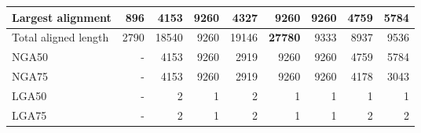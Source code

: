 \documentclass[12pt,a4paper]{article}
\begin{document}
\begin{table}[ht]
\begin{center}
\begin{tabular}{|l*{8}{|r}|}
Largest alignment & 896 & 4153 & {\bf 9260} & 4327 & {\bf 9260} & {\bf 9260} & 4759 & 5784 \\ \hline
Total aligned length & 2790 & 18540 & 9260 & 19146 & {\bf 27780} & 9333 & 8937 & 9536 \\ \hline
NGA50 & - & 4153 & 9260 & 2919 & 9260 & 9260 & 4759 & 5784 \\ \hline
NGA75 & - & 4153 & 9260 & 2919 & 9260 & 9260 & 4178 & 3043 \\ \hline
LGA50 & - & 2 & 1 & 2 & 1 & 1 & 1 & 1 \\ \hline
LGA75 & - & 2 & 1 & 2 & 1 & 1 & 2 & 2 \\ \hline
\end{tabular}
\end{center}
\end{table}
\end{document}

